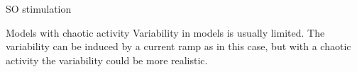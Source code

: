 \documentclass[aspectratio=43]{beamer}
\begin{document}
\begin{frame}{SO stimulation}
\begin{figure}[hbt!]
\begin{minipage}[b]{0.44\textwidth}
\begin{minipage}[b]{\textwidth}
					\end{minipage}
				\end{minipage}
			\end{figure}
			
\end{frame}


\begin{frame}{Models with chaotic activity}
	Variability in models is usually limited. The variability can be induced by a current ramp as in this case, but with a chaotic activity the variability could be more realistic. 
	\vspace{8pt}
	\begin{columns}
\end{columns}
\end{frame}
\end{document}
